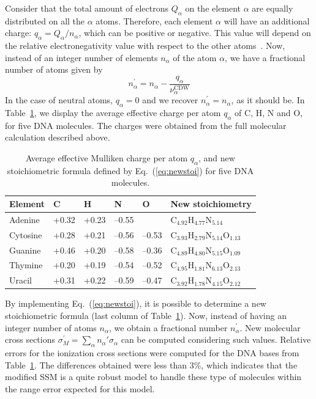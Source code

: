 \documentclass[preprint]{revtex4-2}
\begin{document}
Consider that the total amount of electrons $Q_{\alpha }$ on the element
$\alpha$ are equally distributed on all the $\alpha$ atoms. Therefore, 
each element $\alpha$ will have an additional charge: 
$q_{\alpha}=Q_{\alpha}/n_{\alpha}$, which can be positive or negative.
This value will depend on the relative electronegativity value with 
respect to the other atoms~\cite{rappe1991}. Now, instead of an
integer number of elements $n_{\alpha}$ of the atom $\alpha$, we have a 
fractional number of atoms given by 
\begin{equation}
n_{\alpha }^{\prime }=n_{\alpha }-
\frac{q_{\alpha }}{\nu_{\alpha }^{\text{CDW}}}
\label{eq:newstoi}
\end{equation}%
In the case of neutral atoms, $q_{\alpha}=0$ and we recover 
$n_{\alpha}^{\prime}=n_{\alpha}$, as it should be. 
In Table~\ref{tab:newstoi}, we display the average effective charge 
per atom $q_{\alpha}$ of C, H, N and O, for five DNA molecules. 
The charges were obtained from the full molecular calculation described 
above.

\begin{table}[H]
\begin{center}
\begin{tabular}{|p{}|p{}|p{}|p{
}|p{}|p{}|}
\hline
Element & C & H & N & O & New stoichiometry \\
\hline
Adenine & +0.32 & +0.23 & --0.55 &       & 
C$_{4.92}$H$_{4.77}$N$_{5.14}$ \\ 
\hline
Cytosine & +0.28 & +0.21 & --0.56 & --0.53 & 
C$_{3.93}$H$_{2.79}$N$_{5.14}$O$_{1.13}$ \\ 
\hline
Guanine & +0.46 & +0.20 & --0.58 & --0.36 & 
C$_{4.89}$H$_{4.80}$N$_{5.15}$O$_{1.09}$ \\ 
\hline
Thymine & +0.20 & +0.19 & --0.54 & --0.52 & 
C$_{4.95}$H$_{1.81}$N$_{6.13}$O$_{2.13}$ \\ 
\hline
Uracil & +0.31 & +0.22 & --0.59 & --0.47 & 
C$_{3.92}$H$_{1.78}$N$_{4.15}$O$_{2.12}$ \\ 
\hline
\end{tabular}
\caption{Average effective Mulliken charge per atom $q_{\alpha}$, and 
new stoichiometric formula defined by Eq.~(\ref{eq:newstoi}) for five 
DNA molecules.}
\label{tab:newstoi}
\end{center}
\end{table}


By implementing Eq.~(\ref{eq:newstoi}), it is possible to determine a 
new stoichiometric formula (last column of Table~\ref{tab:newstoi}). 
Now, instead of having an integer number of atoms $n_{\alpha}$, we obtain 
a fractional number $n_{\alpha}^{\prime}$. New molecular cross sections 
$\sigma^{\prime}_{M}=\sum_{\alpha}n_{\alpha}'\sigma_{\alpha}$ can be 
computed considering 
such values. Relative errors for the ionization cross sections were 
computed for the DNA bases from Table~\ref{tab:newstoi}. The differences 
obtained were less than 3\%, which indicates that the modified 
SSM is a quite robust model to handle these type of molecules within 
the range error expected for this model.
\end{document}
